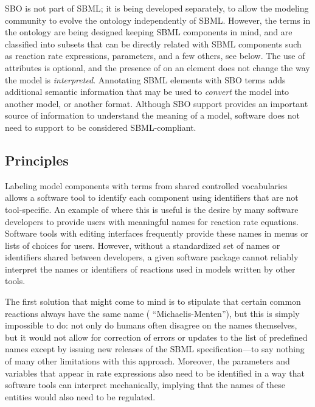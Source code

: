 SBO is not part of SBML; it is being developed separately, to
allow the modeling community to evolve the ontology independently
of SBML.  However, the terms in the ontology are being designed
keeping SBML components in mind, and are classified into subsets that
can be directly related with SBML components such as reaction rate
expressions, parameters, and a few others, see below.  The use of
 attributes is optional, and the presence of
 on an element does not change the way the model is
\emph{interpreted}.  Annotating SBML elements with SBO terms
adds additional semantic information that may be used to
\emph{convert} the model into another model, or another format.
Although SBO support provides an important source of information to
understand the meaning of a model, software does not need to
support  to be considered SBML-compliant.

\subsection{Principles}
\label{sec:sbo-principles}

Labeling model components with terms from shared controlled
vocabularies allows a software tool to identify each component using
identifiers that are not tool-specific.  An example of where this
is useful is the desire by many software developers to provide
users with meaningful names for reaction rate equations.  Software
tools with editing interfaces frequently provide these names
in menus or lists of choices for users.  However, without a
standardized set of names or identifiers shared between
developers, a given software package cannot reliably interpret the
names or identifiers of reactions used in models written
by other tools.

The first solution that might come to mind is to stipulate that
certain common reactions always have the same name (\eg
``Michaelis-Menten''), but this is simply impossible to do: not
only do humans often disagree on the names themselves, but it
would not allow for correction of errors or updates to the list of
predefined names except by issuing new releases of the SBML
specification---to say nothing of many other limitations with this
approach.  Moreover, the parameters and variables that appear in
rate expressions also need to be identified in a way that software
tools can interpret mechanically, implying that the names of these
entities would also need to be regulated.

